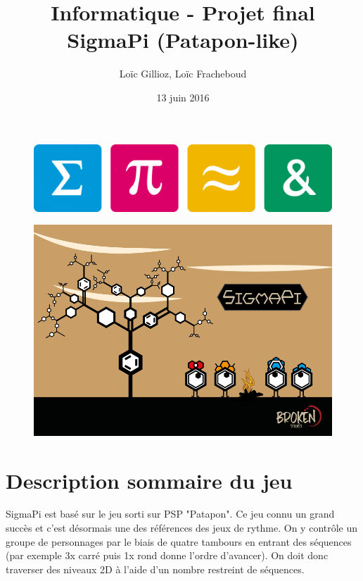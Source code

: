 \documentclass[a4paper,10pt]{article}
\author{Loïc Gillioz, Loïc Fracheboud}
\title{Informatique - Projet final \\ \Huge SigmaPi (Patapon-like)}
\date{13 juin 2016}
\begin{document}
 \maketitle
 \begin{figure}[!h]
 \centering

 \includegraphics[scale=0.15]{images/icones}
 \end{figure}
 \begin{figure}[!h]
 \centering
 \includegraphics[scale=0.5]{images/couverture}
 \end{figure}
 \pagebreak
 
 \section{Description sommaire du jeu}
  SigmaPi est basé sur le jeu sorti sur PSP "Patapon". Ce jeu connu un grand succès et c'est désormais une des références des jeux de rythme. On y contrôle un groupe de personnages par le biais de quatre tambours en entrant des séquences (par exemple 3x carré puis 1x rond donne l'ordre d'avancer). On doit donc traverser des niveaux 2D à l'aide d'un nombre restreint de séquences.
\end{document}
